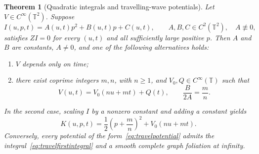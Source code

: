 \documentclass[review,12pt,times,a4paper,nopreprintline]{elsarticle}
\theoremstyle{plain}
\newtheorem{theorem}{Theorem}[section]
\theoremstyle{definition}
\theoremstyle{remark}
\newcommand{\T}{\mathbb T}
\numberwithin{equation}{section}
\begin{document}
\begin{theorem}[Quadratic integrals and travelling-wave potentials]\label{thm:quadratic}
Let $V\in C^\infty(\T^2)$. Suppose
\begin{equation}\label{eq:quadraticintegral}
 I(u,p,t)=A(u,t)p^2+B(u,t)p+C(u,t),
 \qquad A,B,C\in C^2(\T^2),\quad A\not\equiv0,
\end{equation}
satisfies $ZI=0$ for every $(u,t)$ and all sufficiently large positive $p$. Then $A$ and $B$ are constants, $A\ne0$, and one of the following alternatives holds:
\begin{enumerate}
\item $V$ depends only on time;
\item there exist coprime integers $m,n$, with $n\geq1$, and $V_0,Q\in C^\infty(\T)$ such that
\begin{equation}\label{eq:travelpotential}
 V(u,t)=V_0(nu+mt)+Q(t),\qquad \frac B{2A}=\frac mn.
\end{equation}
\end{enumerate}
In the second case, scaling $I$ by a nonzero constant and adding a constant yields
\begin{equation}\label{eq:travelfirstintegral}
 K(u,p,t)=\frac12\left(p+\frac mn\right)^2+V_0(nu+mt).
\end{equation}
Conversely, every potential of the form~\eqref{eq:travelpotential} admits the integral~\eqref{eq:travelfirstintegral} and a smooth complete graph foliation at infinity.
\end{theorem}
\end{document}
